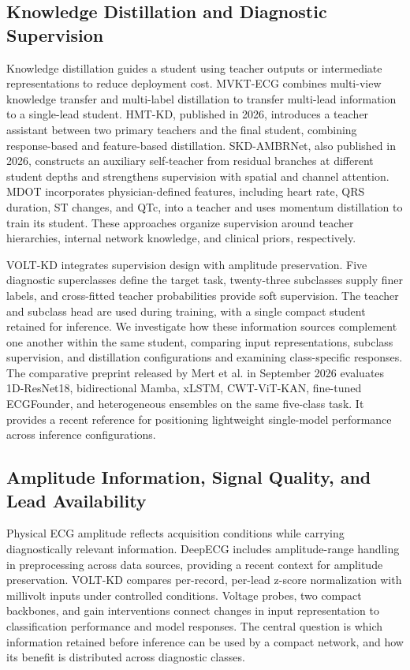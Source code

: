 \documentclass[11pt,a4paper]{article}
\begin{document}
\subsection{Knowledge Distillation and Diagnostic Supervision}
Knowledge distillation guides a student using teacher outputs or intermediate representations to reduce deployment cost. MVKT-ECG combines multi-view knowledge transfer and multi-label distillation to transfer multi-lead information to a single-lead student\cite{qin2023}. HMT-KD, published in 2026, introduces a teacher assistant between two primary teachers and the final student, combining response-based and feature-based distillation\cite{beigzadeh2026}. SKD-AMBRNet, also published in 2026, constructs an auxiliary self-teacher from residual branches at different student depths and strengthens supervision with spatial and channel attention\cite{qian2026}. MDOT incorporates physician-defined features, including heart rate, QRS duration, ST changes, and QTc, into a teacher and uses momentum distillation to train its student\cite{yisimitila2025}. These approaches organize supervision around teacher hierarchies, internal network knowledge, and clinical priors, respectively.

VOLT-KD integrates supervision design with amplitude preservation. Five diagnostic superclasses define the target task, twenty-three subclasses supply finer labels, and cross-fitted teacher probabilities provide soft supervision. The teacher and subclass head are used during training, with a single compact student retained for inference. We investigate how these information sources complement one another within the same student, comparing input representations, subclass supervision, and distillation configurations and examining class-specific responses. The comparative preprint released by Mert et al. in September 2026 evaluates 1D-ResNet18, bidirectional Mamba, xLSTM, CWT-ViT-KAN, fine-tuned ECGFounder, and heterogeneous ensembles on the same five-class task\cite{mert2026}. It provides a recent reference for positioning lightweight single-model performance across inference configurations.

\subsection{Amplitude Information, Signal Quality, and Lead Availability}
Physical ECG amplitude reflects acquisition conditions while carrying diagnostically relevant information. DeepECG includes amplitude-range handling in preprocessing across data sources\cite{nolin2026}, providing a recent context for amplitude preservation. VOLT-KD compares per-record, per-lead z-score normalization with millivolt inputs under controlled conditions. Voltage probes, two compact backbones, and gain interventions connect changes in input representation to classification performance and model responses. The central question is which information retained before inference can be used by a compact network, and how its benefit is distributed across diagnostic classes.
\end{document}
